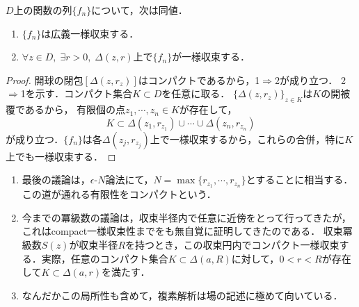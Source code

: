 \documentclass[uplatex, dvipdfmx]{jsreport}
\begin{document}
\begin{lemma}
    $D$上の関数の列$\{f_n\}$について，次は同値．
    \begin{enumerate}
        \item $\{f_n\}$は広義一様収束する．
        \item $\forall z\in D,\;\exists r>0,\;\Delta(z,r)$上で$\{f_n\}$が一様収束する．
    \end{enumerate}
\end{lemma}
\begin{proof}
    開球の閉包$[\Delta(z,r_z)]$はコンパクトであるから，1$\Rightarrow$2が成り立つ．
    2$\Rightarrow$1を示す．コンパクト集合$K\subset D$を任意に取る．
    $\{\Delta(z,r_z)\}_{z\in K}$は$K$の開被覆であるから，
    有限個の点$z_1,\cdots,z_n\in K$が存在して，
    \[ K\subset\Delta(z_1,r_{z_1})\cup\cdots\cup\Delta(z_n,r_{z_n}) \]
    が成り立つ．$\{f_n\}$は各$\Delta(z_j,r_{z_j})$上で一様収束するから，これらの合併，特に$K$上でも一様収束する．
\end{proof}
\begin{remark}\mbox{}\label{remark-compact-convergence-and-power-series}
    \begin{enumerate}
        \item 最後の議論は，$\epsilon$-$N$論法にて，$N=\max\{r_{z_1},\cdots,r_{z_n}\}$とすることに相当する．この道が通れる有限性をコンパクトという．
        \item 今までの冪級数の議論は，収束半径内で任意に近傍をとって行ってきたが，これはcompact一様収束性までをも無自覚に証明してきたのである．
        収束冪級数$S(z)$が収束半径$R$を持つとき，この収束円内でコンパクト一様収束する．実際，任意のコンパクト集合$K\subset\Delta(a,R)$に対して，$0<r<R$が存在して$K\subset\Delta(a,r)$を満たす．
        \item なんだかこの局所性も含めて，複素解析は場の記述に極めて向いている．
    \end{enumerate}
\end{remark}
\end{document}
